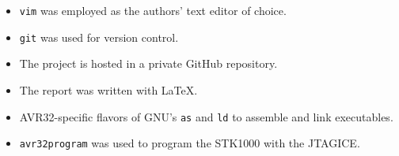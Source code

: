 \begin{itemize}
\item \texttt{vim} was employed as the authors' text editor of choice.
\item \texttt{git} was used for version control.
\item The project is hosted in a private GitHub repository.
\item The report was written with \LaTeX.
\item AVR32-specific flavors of GNU's \texttt{as} and \texttt{ld} to assemble and link executables.
\item \texttt{avr32program} was used to program the STK1000 with the JTAGICE.
\end{itemize}
